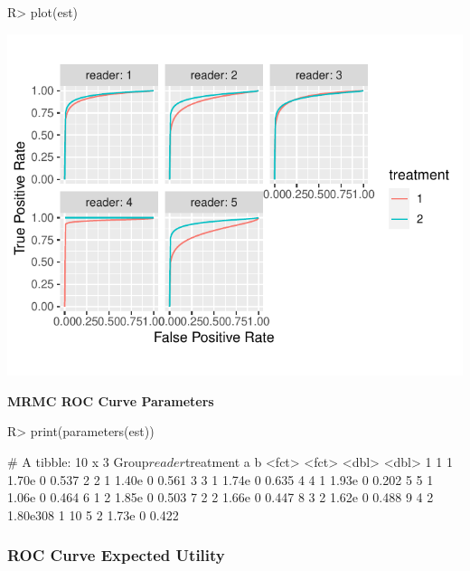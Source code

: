 \documentclass[
]{jss}
\begin{document}
\begin{CodeChunk}
\begin{CodeInput}
R> plot(est)
\end{CodeInput}


\begin{center}\includegraphics{MRMCaov_files/figure-latex/unnamed-chunk-13-1} \end{center}

\end{CodeChunk}

\textbf{MRMC ROC Curve Parameters}

\begin{CodeChunk}
\begin{CodeInput}
R> print(parameters(est))
\end{CodeInput}
\begin{CodeOutput}
# A tibble: 10 x 3
   Group$reader $treatment        a     b
   <fct>        <fct>         <dbl> <dbl>
 1 1            1          1.70e  0 0.537
 2 2            1          1.40e  0 0.561
 3 3            1          1.74e  0 0.635
 4 4            1          1.93e  0 0.202
 5 5            1          1.06e  0 0.464
 6 1            2          1.85e  0 0.503
 7 2            2          1.66e  0 0.447
 8 3            2          1.62e  0 0.488
 9 4            2          1.80e308 1    
10 5            2          1.73e  0 0.422
\end{CodeOutput}
\end{CodeChunk}

\hypertarget{roc-curve-expected-utility}{%
\subsubsection{ROC Curve Expected
Utility}\label{roc-curve-expected-utility}}
\end{document}
